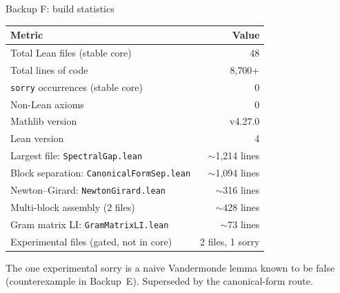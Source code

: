 \documentclass[aspectratio=169,10pt]{beamer}
\begin{document}
\begin{frame}{Backup F: build statistics}
    \vspace{-0.6em}

    \renewcommand{\arraystretch}{1.15}
    {\footnotesize
        \begin{tabular}{p{} r}
            \toprule
            \textbf{Metric}                                  & \textbf{Value}        \\
            \midrule
            \rowcolor{cardbg}
            Total Lean files (stable core)                   & 48                    \\
            \rowcolor{cardbg}
            Total lines of code                              & 8{,}700+              \\
            \rowcolor{cardbg}
            \texttt{sorry} occurrences (stable core)         & 0                     \\
            \rowcolor{cardbg}
            Non-Lean axioms                                  & 0                     \\
            \rowcolor{cardbg}
            Mathlib version                                  & v4.27.0               \\
            \rowcolor{cardbg}
            Lean version                                     & 4                     \\
            \midrule
            \rowcolor{cardbg}
            Largest file: \texttt{SpectralGap.lean}          & ${\sim}$1{,}214 lines \\
            \rowcolor{cardbg}
            Block separation: \texttt{CanonicalFormSep.lean} & ${\sim}$1{,}094 lines \\
            \rowcolor{cardbg}
            Newton--Girard: \texttt{NewtonGirard.lean}       & ${\sim}$316 lines     \\
            \rowcolor{cardbg}
            Multi-block assembly (2 files)                   & ${\sim}$428 lines     \\
            \rowcolor{cardbg}
            Gram matrix LI: \texttt{GramMatrixLI.lean}       & ${\sim}$73 lines      \\
            \midrule
            \rowcolor{cardbg}
            Experimental files (gated, not in core)          & 2 files, 1 sorry      \\
            \bottomrule
        \end{tabular}
    }

    \vspace{0.3em}
    \textcolor{dimwhite}{\footnotesize The one experimental sorry is a naive Vandermonde lemma known to be false
        (counterexample in Backup~E). Superseded by the canonical-form route.}
\end{frame}
\end{document}

